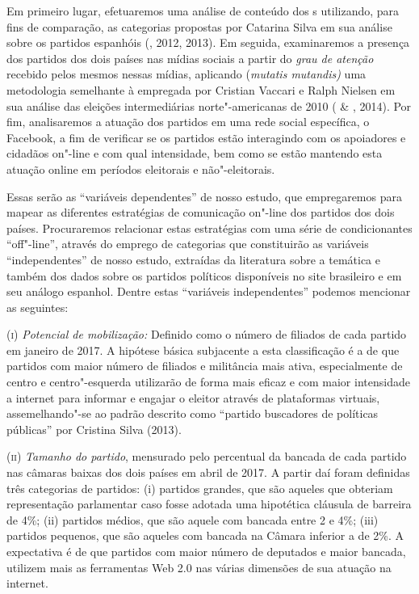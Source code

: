 Em primeiro lugar, efetuaremos uma análise de conteúdo dos s
utilizando, para fins de comparação, as categorias propostas por
Catarina Silva em sua análise sobre os partidos espanhóis (, 2012,
2013). Em seguida, examinaremos a presença dos partidos dos dois países
nas mídias sociais a partir do \emph{grau de atenção} recebido pelos
mesmos nessas mídias, aplicando (\emph{mutatis mutandis)} uma
metodologia semelhante à empregada por Cristian Vaccari e Ralph Nielsen
em sua análise das eleições intermediárias norte"-americanas de 2010
( \& , 2014). Por fim, analisaremos a atuação dos partidos
em uma rede social específica, o Facebook, a fim de verificar se os
partidos estão interagindo com os apoiadores e cidadãos on"-line e com
qual intensidade, bem como se estão mantendo esta atuação online em
períodos eleitorais e não"-eleitorais.

Essas serão as ``variáveis dependentes'' de nosso estudo, que
empregaremos para mapear as diferentes estratégias de comunicação
on"-line dos partidos dos dois países. Procuraremos relacionar estas
estratégias com uma série de condicionantes ``off"-line'', através do
emprego de categorias que constituirão as variáveis ``independentes'' de
nosso estudo, extraídas da literatura sobre a temática e também dos
dados sobre os partidos políticos disponíveis no site  brasileiro e
em seu análogo espanhol. Dentre estas ``variáveis independentes''
podemos mencionar as seguintes:

(\textsc{i}) \emph{Potencial de mobilização:} Definido como o número de
filiados de cada partido em janeiro de 2017. A hipótese básica
subjacente a esta classificação é a de que partidos com maior número de
filiados e militância mais ativa, especialmente de centro e
centro"-esquerda utilizarão de forma mais eficaz e com maior intensidade
a internet para informar e engajar o eleitor através de plataformas
virtuais, assemelhando"-se ao padrão descrito como ``partido buscadores
de políticas públicas'' por Cristina Silva (2013).

(\textsc{ii}) \emph{Tamanho do partido}, mensurado pelo percentual da
bancada de cada partido nas câmaras baixas dos dois países em abril de
2017. A partir daí foram definidas três categorias de partidos: (i)
partidos grandes, que são aqueles que obteriam representação parlamentar
caso fosse adotada uma hipotética cláusula de barreira de 4\%; (ii)
partidos médios, que são aquele com bancada entre 2 e 4\%; (iii)
partidos pequenos, que são aqueles com bancada na Câmara inferior a de
2\%. A expectativa é de que partidos com maior número de deputados e
maior bancada, utilizem mais as ferramentas Web 2.0 nas várias dimensões
de sua atuação na internet.

